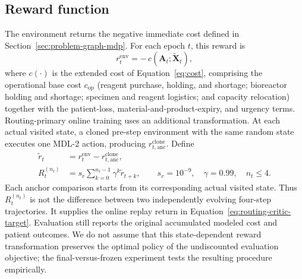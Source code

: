 \documentclass[preprint,review,12pt]{elsarticle}
\begin{document}
\subsection*{Reward function}
The environment returns the negative immediate cost defined in Section~\ref{sec:problem-graph-mdp}. For each epoch $t$, this reward is
\begin{equation}
r_t^{\mathrm{env}} = -\,c(\mathbf{A}_t;\tilde{\mathbf{X}}_t),
\end{equation}
where $c(\cdot)$ is the extended cost of Equation~\eqref{eq:cost}, comprising the operational base cost $c_{\mathrm{op}}$ (reagent purchase, holding, and shortage; bioreactor holding and shortage; specimen and reagent logistics; and capacity relocation) together with the patient-loss, material-and-product-expiry, and urgency terms. Routing-primary online training uses an additional transformation. At each actual visited state, a cloned pre-step environment with the same random state executes one MDL-2 action, producing $r_{t,\mathrm{anc}}^{\mathrm{clone}}$. Define
\begin{align}
\widetilde r_t &= r_t^{\mathrm{env}}-r_{t,\mathrm{anc}}^{\mathrm{clone}},\\
R_t^{(n_t)} &= s_r\sum_{k=0}^{n_t-1}\gamma^k\widetilde r_{t+k},
\qquad s_r=10^{-9},\quad\gamma=0.99,\quad n_t\leq4.
\end{align}
Each anchor comparison starts from its corresponding actual visited state.
Thus $R_t^{(n_t)}$ is not the difference between two independently evolving
four-step trajectories. It supplies the online replay return in
Equation~\eqref{eq:routing-critic-target}. Evaluation still reports the
original accumulated modeled cost and patient outcomes. We do not assume
that this state-dependent reward transformation preserves the optimal policy
of the undiscounted evaluation objective; the final-versus-frozen experiment
tests the resulting procedure empirically.
\end{document}
